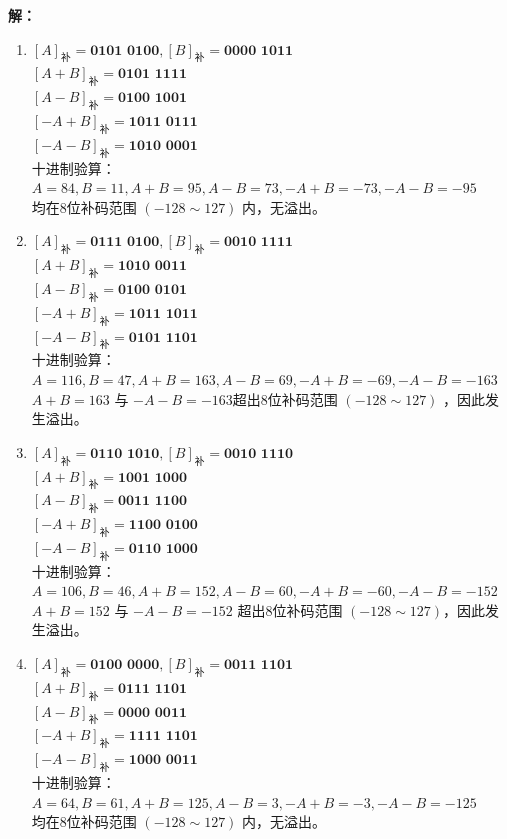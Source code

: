 \documentclass[10pt, a4paper]{article}
\newcommand{\solution}[1]{
    \noindent\textbf{解：}{\songti #1} \par\vspace{3ex}
}
\begin{document}
\solution{
\begin{enumerate}
    \item $ [A]_{\text{补}}=\textbf{0101\ 0100}, [B]_{\text{补}}=\textbf{0000\ 1011} $\\
    $ [A+B]_{\text{补}}=\textbf{0101\ 1111} $\\
    $ [A-B]_{\text{补}}=\textbf{0100\ 1001} $\\
    $ [-A+B]_{\text{补}}=\textbf{1011\ 0111} $\\
    $ [-A-B]_{\text{补}}=\textbf{1010\ 0001} $ \\
    十进制验算：$ A=84, B=11, A+B=95, A-B=73, -A+B=-73, -A-B=-95 $ \\
    均在8位补码范围 $ (-128\sim 127) $ 内，无溢出。

    \item $ [A]_{\text{补}}=\textbf{0111\ 0100}, [B]_{\text{补}}=\textbf{0010\ 1111} $\\
    $ [A+B]_{\text{补}}=\textbf{1010\ 0011} $\\
    $ [A-B]_{\text{补}}=\textbf{0100\ 0101} $\\
    $ [-A+B]_{\text{补}}=\textbf{1011\ 1011} $\\
    $ [-A-B]_{\text{补}}=\textbf{0101\ 1101} $\\
    十进制验算：$ A=116, B=47, A+B=163, A-B=69, -A+B=-69, -A-B=-163 $ \\
    $ A+B=163 $ 与 $ -A-B=-163 $超出8位补码范围 $ (-128\sim 127) $ ，因此发生溢出。

    \item $[A]_{\text{补}}=\textbf{0110\ 1010}, [B]_{\text{补}}=\textbf{0010\ 1110} $\\
    $ [A+B]_{\text{补}}=\textbf{1001\ 1000} $\\
    $ [A-B]_{\text{补}}=\textbf{0011\ 1100} $\\
    $ [-A+B]_{\text{补}}=\textbf{1100\ 0100} $\\
    $ [-A-B]_{\text{补}}=\textbf{0110\ 1000} $\\
    十进制验算：$ A=106, B=46, A+B=152, A-B=60, -A+B=-60, -A-B=-152 $ \\
    $ A+B=152 $ 与 $ -A-B=-152 $ 超出8位补码范围 $(-128\sim127)$，因此发生溢出。

    \item $ [A]_{\text{补}}=\textbf{0100\ 0000}, [B]_{\text{补}}=\textbf{0011\ 1101} $\\
    $ [A+B]_{\text{补}}=\textbf{0111\ 1101} $\\
    $ [A-B]_{\text{补}}=\textbf{0000\ 0011} $\\
    $ [-A+B]_{\text{补}}=\textbf{1111\ 1101} $\\
    $ [-A-B]_{\text{补}}=\textbf{1000\ 0011} $\\
    十进制验算：$ A=64, B=61, A+B=125, A-B=3, -A+B=-3, -A-B=-125 $ \\
    均在8位补码范围 $ (-128\sim 127) $ 内，无溢出。
\end{enumerate}
}
\end{document}
